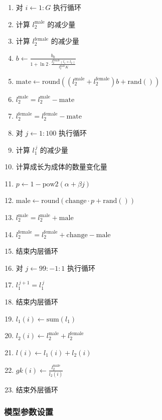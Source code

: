 \documentclass[11pt,a4paper]{ctexart}
\begin{document}
\begin{enumerate}
\item 对 $i\leftarrow 1:G$ 执行循环
\item \quad 计算 $l_2^{\mathrm{male}}$ 的减少量
\item \quad 计算 $l_2^{\mathrm{female}}$ 的减少量
\item \quad $b\leftarrow \frac{b_0}{1+\ln 2\cdot \frac{l_2^{\mathrm{female}}\left(l_1+l_2\right)}{l_2^{\mathrm{male}}K}}$
\item \quad $\mathrm{mate}\leftarrow \mathrm{round}\left(\left(l_2^{\mathrm{male}}+l_2^{\mathrm{female}}\right)b+\mathrm{rand}()\right)$
\item \quad $l_2^{\mathrm{male}}=l_2^{\mathrm{male}}-\mathrm{mate}$
\item \quad $l_2^{\mathrm{female}}=l_2^{\mathrm{female}}-\mathrm{mate}$
\item \quad 对 $j\leftarrow 1:100$ 执行循环
\item \quad\quad 计算 $l_1^{\,j}$ 的减少量
\item \quad\quad 计算成长为成体的数量变化量
\item \quad\quad $p\leftarrow 1-\mathrm{pow2}\left(\alpha+\beta j\right)$
\item \quad\quad $\mathrm{male}\leftarrow \mathrm{round}\left(\mathrm{change}\cdot p+\mathrm{rand}()\right)$
\item \quad\quad $l_2^{\mathrm{male}}=l_2^{\mathrm{male}}+\mathrm{male}$
\item \quad\quad $l_2^{\mathrm{female}}=l_2^{\mathrm{female}}+\mathrm{change}-\mathrm{male}$
\item \quad 结束内层循环
\item \quad 对 $j\leftarrow 99:-1:1$ 执行循环
\item \quad\quad $l_1^{\,j+1}=l_1^{\,j}$
\item \quad 结束内层循环
\item \quad $l_1(i)\leftarrow \mathrm{sum}\left(l_1\right)$
\item \quad $l_2(i)\leftarrow l_2^{\mathrm{male}}+l_2^{\mathrm{female}}$
\item \quad $l(i)\leftarrow l_1(i)+l_2(i)$
\item \quad $gk(i)\leftarrow \frac{l_2^{\mathrm{male}}}{l_2(i)}$
\item 结束外层循环
\end{enumerate}
\vspace{0.5em}

\subsubsection{模型参数设置}
\end{document}
